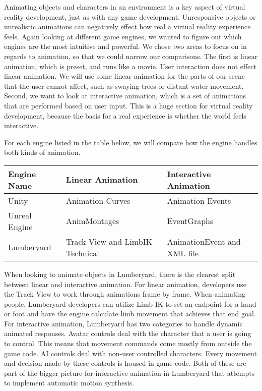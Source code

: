 \documentclass[10pt,journal,compsoc,onecolumn, draftclsnofoot]{IEEEtran}
\begin{document}
Animating objects and characters in an environment is a key aspect of virtual reality development, just as with any game development.
Unresponsive objects or unrealistic animations can negatively effect how real a virtual reality experience feels.
Again looking at different game engines, we wanted to figure out which engines are the most intuitive and powerful.
We chose two areas to focus on in regards to animation, so that we could narrow our comparisons.
The first is linear animation, which is preset, and runs like a movie. User interaction does not effect linear animation.
We will use some linear animation for the parts of our scene that the user cannot affect, such as swaying trees or distant water movement.
Second, we want to look at interactive animation, which is a set of animations that are performed based on user input.
This is a huge section for virtual reality development, because the basis for a real experience is whether the world feels interactive.

For each engine listed in the table below, we will compare how the engine handles both kinds of animation.

\vspace{2mm}
\begin{table}[h!]
\centering
  \begin{tabu} to 1.0\textwidth { | X[l] || X[c] | X[c] |  }
  \hline
  Engine Name & Linear Animation & Interactive Animation\\
  \hline
  Unity  & Animation Curves & Animation Events\\
  Unreal Engine & AnimMontages & EventGraphs\\
  Lumberyard & Track View and LimbIK Technical & AnimationEvent and XML file\\
  \hline
  \end{tabu}
\end{table}
\vspace{2mm}

When looking to animate objects in Lumberyard, there is the clearest split between linear and interactive animation.
For linear animation, developers use the Track View to work through animations frame by frame.
When animating people, Lumberyard developers can utilize Limb IK to set an endpoint for a hand or foot and have the engine calculate limb movement that achieves that end goal. \cite{lumberyard_animation}
For interactive animation, Lumberyard has two categories to handle dynamic animated responses.
Avatar controls deal with the character that a user is going to control.  This means that movement commands come mostly from outside the game code.
AI controls deal with non-user controlled characters.  Every movement and decision made by these controls is housed in game code.
Both of these are part of the bigger picture for interactive animation in Lumberyard that attempts to implement automatic motion synthesis. \cite{lumberyard_animation}
\end{document}

